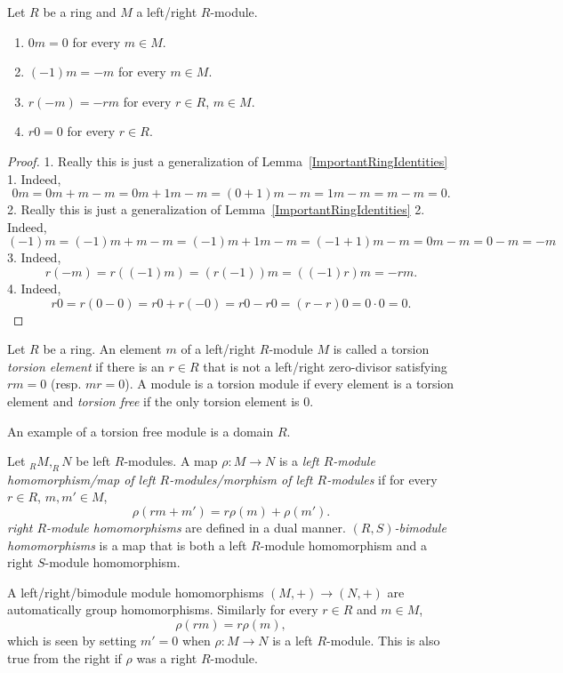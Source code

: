 \begin{lemma}
    Let $R$ be a ring and $M$ a left/right $R$-module. 
    \begin{enumerate}
        \item $0m = 0$ for every $m\in M$.
        \item $(-1)m = -m$ for every $m\in M$.
        \item $r(-m) = -rm$ for every $r\in R$, $m\in M$.
        \item $r0 = 0$ for every $r\in R$.
    \end{enumerate}
\end{lemma}
\begin{proof}
    1. Really this is just a generalization of Lemma~\ref{ImportantRingIdentities} 1. Indeed,
    $$0m = 0m + m -m = 0m+1m-m = (0+1)m-m = 1m -m =m-m = 0.$$
    2. Really this is just a generalization of Lemma~\ref{ImportantRingIdentities} 2. Indeed,
    $$(-1)m=(-1)m +m-m = (-1)m+1m-m = (-1+1)m-m = 0m-m=0-m=-m$$
    3. Indeed,
    $$r(-m) = r((-1)m) = (r(-1))m=((-1)r)m=-rm.$$
    4. Indeed,
    $$r0 = r(0-0)=r0+r(-0)=r0-r0=(r-r)0=0\cdot 0 = 0.$$
\end{proof}
\begin{definition}
    Let $R$ be a ring. An element $m$ of a left/right $R$-module $M$ is called a torsion \textit{torsion element} if there is an $r\in R$  that is not a left/right zero-divisor satisfying $rm =0$ (resp. $mr=0$). A module is a torsion module if every element is a torsion element and \textit{torsion free} if the only torsion element is $0$.
\end{definition}
\begin{remark}
    An example of a torsion free module is a domain $R$.
\end{remark}
\begin{definition}
    Let $_RM, _RN$ be left $R$-modules. A map $\rho : M \rightarrow N$ is a \textit{left $R$-module homomorphism/map of left $R$-modules/morphism of left $R$-modules} if for every $r\in R$, $m,m'\in M$,
    $$\rho(rm+m') = r\rho(m)+\rho(m').$$
    \textit{right $R$-module homomorphisms} are defined in a dual manner. \textit{$(R,S)$-bimodule homomorphisms} is a map that is both a left $R$-module homomorphism and a right $S$-module homomorphism. 
\end{definition}
\begin{remark}
    A left/right/bimodule module homomorphisms $(M,+)\rightarrow (N,+)$ are automatically group homomorphisms. Similarly for every $r\in R$ and $m\in M$,
    $$\rho(rm) = r\rho(m),$$
    which is seen by setting $m' = 0$ when $\rho: M\rightarrow N$ is a left $R$-module. This is also true from the right if $\rho$ was a right $R$-module.
\end{remark}
